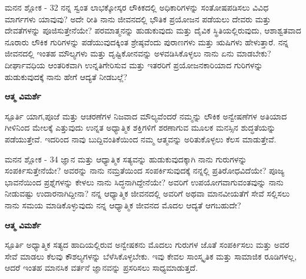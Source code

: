 \newpage
\begin{mananam}{\mananamfont ಮನನ ಶ್ಲೋಕ - \textenglish{32}}
\footnotesize \mananamtext ನನ್ನ ಸ್ವಂತ ಲಾಭಕ್ಕೋಸ್ಕರ ಲೌಕಿಕದಲ್ಲಿ  ಅಧಿಕಾರಿಗಳನ್ನು ಸಂತೋಷಪಡಿಸಲು  ವಿವಿಧ ಮಾರ್ಗಗಳು ಯಾವುವು? ಅದೇ ರೀತಿ ನಾನು ಜೀವನದಲ್ಲಿ ಭೌತಿಕ ಪ್ರಯೋಜನ ಪಡೆಯಲು ದೇವರು ಮತ್ತು ದೇವತೆಗಳನ್ನು ಪೂಜಿಸುತ್ತೇನೆಯೇ? ಪರಮಾತ್ಮನನ್ನು ಹುಡುಕುವುದು ಮತ್ತು ದೈವಿಕ ಸ್ಥಿತಿಯಲ್ಲಿರುವುದು, ಆಶಾಶ್ವತವಾದ ನೂರಾರು ಲೌಕಿಕ ಗುರಿಗಳನ್ನು ಪಡೆಯುವುದಕ್ಕಿಂತ ಶ್ರೇಷ್ಠವೆಂದು ಪುರಾಣಗಳು ಮತ್ತು ಋಷಿಗಳು ಹೇಳುತ್ತಾರೆ. ನನ್ನ ಜೀವನದಲ್ಲಿ ಇಂತಹ ಮೌಲ್ಯಗಳು ಮತ್ತು ದೃಷ್ಟಿಕೋನವನ್ನು ಅಳವಡಿಸಿಕೊಳ್ಳಲು ನಾನು ಏನು ಮಾಡಬೇಕು? ದೀರ್ಘಾವಧಿಯ ಆಂತರಿಕವಾಗಿ ಉನ್ನತಿಗೇರಿಸುವ ಮತ್ತು ಇತರರಿಗೆ ಪ್ರಯೋಜನಕಾರಿಯಾದ ಗುರಿಗಳನ್ನು ಹುಡುಕುವುದಕ್ಕೆ ನಾನು ಹೇಗೆ ಆದ್ಯತೆ ನೀಡಬಲ್ಲೆ?
\end{mananam}
\WritingHand\enspace\textbf{ಆತ್ಮ ವಿಮರ್ಶೆ}\\
\begin{inspiration}{\mananamfont ಸ್ಪೂರ್ತಿ}
\footnotesize \mananamtext ಯಾಗ,ಪೂಜೆ ಮತ್ತು ಆಚರಣೆಗಳ ನಿಜವಾದ ಮೌಲ್ಯವೆಂದರೆ ನಮ್ಮನ್ನು ಲೌಕಿಕ ಅನ್ವೇಷಣೆಗಳ ಅತಿಯಾದ ಗೀಳಿನಿಂದ ಮೇಲಕ್ಕೆ ಎತ್ತುವುದು ಉನ್ನತ ಅಧ್ಯಾತ್ಮಿಕ ಶಕ್ತಿಗಳಿಗೆ ಶರಣಾಗುವ ಮೂಲಕ ಮನಸ್ಸಿನ ಶುದ್ಧತೆಯನ್ನು ಪಡೆಯುತ್ತೇವೆ. ಇದರಿಂದ ನಾವು ಬುದ್ದಿವಂತಿಕೆಯಿಂದ ನಮ್ಮ ಆತ್ಮವನ್ನು ಅರಿತುಕೊಳ್ಳಲು ಕೆಲಸ ಮಾಡುತ್ತೇವೆ.\\
\end{inspiration}
\newpage


\newpage
\begin{mananam}{\mananamfont ಮನನ ಶ್ಲೋಕ - \textenglish{34}}
\footnotesize \mananamtext ಜ್ಞಾನ ಮತ್ತು ಆಧ್ಯಾತ್ಮಿಕ ಸತ್ಯವನ್ನು ಹುಡುಕುವುದಕ್ಕಾಗಿ ನಾನು ಗುರುಗಳನ್ನು ಸಂಪರ್ಕಿಸುತ್ತೇನೆಯೇ? ಅವರನ್ನು ನಾನು ನಮ್ರತೆಯಿಂದ ಸಂಪರ್ಕಿಸುವುದಕ್ಕೆ ನನ್ನಲ್ಲಿ ಪ್ರತಿರೋಧವಿದೆಯೇ? ಪೂಜ್ಯ ಭಾವನೆಯಿಂದ ಪ್ರಶ್ನೆಗಳನ್ನು ಕೇಳಲು ನಾನು ಸಿದ್ಧನಾಗಿದ್ದೇನೆಯೇ? ಅವರಿಗೆ ಉಪಯೋಗವಾಗುವಂತವುನ್ನು ನಾನು ನೀಡುವಷ್ಟು ಉದಾರನಾಗಿದ್ದೀನಾ? ನನ್ನ ಆಧ್ಯಾತ್ಮಿಕ ಜೀವನದಲ್ಲಿ ಅವರಿಗೆ ಅಥವಾ ಮಾನವೀಯತೆಗೆ ಸೇವೆ ಸಲ್ಲಿಸಲು ನಾನು ಸಮಯ ಮಾಡಿಕೊಳ್ಳುವುದು ನನ್ನ ಆಧ್ಯಾತ್ಮಿಕ ಜೀವನದ ಮೊದಲ ಆದ್ಯತೆ ಆಗಬಹುದೇ?
\end{mananam}
\WritingHand\enspace\textbf{ಆತ್ಮ ವಿಮರ್ಶೆ}\\
\begin{inspiration}{\mananamfont ಸ್ಪೂರ್ತಿ}
\footnotesize \mananamtext ಅಧ್ಯಾತ್ಮಿಕ ಸತ್ಯದ ಹಾದಿಯಲ್ಲಿರುವ ಅನ್ವೇಷಕನು ಮೊದಲು ಗುರುಗಳ ಜೊತೆ ಸಂಪರ್ಕಿಸಲು ಮತ್ತು ಅವರ ಸೇವೆ ಮಾಡಲು ಕೆಲವು ಕೌಶಲ್ಯಗಳನ್ನು ಬೆಳೆಸಿಕೊಳ್ಳಬೇಕು. ಇವು ಕೇವಲ ಸಾಂಸ್ಕೃತಿಕ ಮತ್ತು ಸಾಮಾಜಿಕ ರೂಡಿಗಳಲ್ಲ, ಆದರೆ ಇಂತಹ ಮಾನಸಿಕ ವರ್ತನೆ ಜ್ಞಾನವನ್ನು ಪ್ರಸರಿಸಲು ಸಾಧ್ಯಮಾಡುತ್ತದೆ.
\end{inspiration}
\newpage

